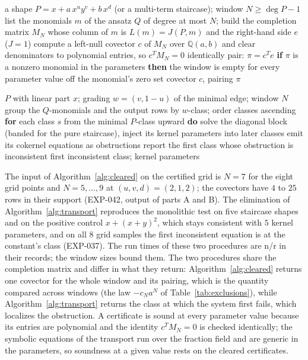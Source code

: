 \documentclass[11pt]{article}
\theoremstyle{remark}
\newcommand{\Q}{\mathbb{Q}}
\begin{document}
\begin{algorithm}[t]
\caption{A2, the cleared window certificate (EXP-042)}\label{alg:cleared}
\begin{algorithmic}[1]
\Require a shape $P=x+a\,x^uy^v+b\,x^d$ (or a multi-term staircase); window $N\ge\deg P-1$
\State list the monomials $m$ of the ansatz $Q$ of degree at most $N$; build the completion matrix $M_N$ whose column of $m$ is $L(m)=J(P,m)$ and the right-hand side $e$ ($J=1$)
\State compute a left-null covector $c$ of $M_N$ over $\Q(a,b)$ and clear denominators to polynomial entries, so $c^TM_N=0$ identically
\State pair: $\pi=c^Te$
\State \textbf{if} $\pi$ is a nonzero monomial in the parameters \textbf{then} the window is empty for every parameter value off the monomial's zero set
\Ensure covector $c$, pairing $\pi$
\end{algorithmic}
\end{algorithm}

\begin{algorithm}[t]
\caption{A3, the classwise transport elimination (EXP-037)}\label{alg:transport}
\begin{algorithmic}[1]
\Require $P$ with linear part $x$; grading $w=(v,1-u)$ of the minimal edge; window $N$
\State group the $Q$-monomials and the output rows by $w$-class; order classes ascending
\State \textbf{for} each class $s$ from the minimal $P$-class upward \textbf{do}
\State \quad solve the diagonal block (banded for the pure staircase), inject its kernel parameters into later classes
\State \quad emit its cokernel equations as obstructions
\State report the first class whose obstruction is inconsistent
\Ensure first inconsistent class; kernel parameters
\end{algorithmic}
\end{algorithm}

The input of Algorithm~\ref{alg:cleared} on the certified grid is $N=7$ for the eight grid points and
$N=5,\dots,9$ at $(u,v,d)=(2,1,2)$; the covectors have $4$ to $25$ rows in their support (EXP-042,
output of parts A and B). The elimination of Algorithm~\ref{alg:transport} reproduces the monolithic
test on five staircase shapes and on the positive control $x+(x+y)^2$, which stays consistent with $5$
kernel parameters, and on all $8$ grid samples the first inconsistent equation is at the constant's class
(EXP-037). The run times of these two procedures are n/r in their records; the window sizes bound them. The two procedures share the completion
matrix and differ in what they return: Algorithm~\ref{alg:cleared} returns one covector for the whole window and its pairing, which is the
quantity compared across windows (the law $-c_Na^N$ of Table~\ref{tab:exclusions}), while Algorithm~\ref{alg:transport} returns the
class at which the system first fails, which localizes the obstruction. A certificate is sound at every parameter value because its
entries are polynomial and the identity $c^TM_N=0$ is checked identically; the symbolic equations of the transport run over the fraction field and are
generic in the parameters, so soundness at a given value rests on the cleared certificates.
\end{document}
